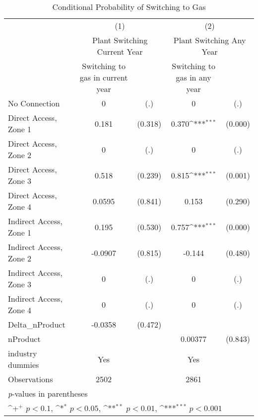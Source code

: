 \begin{table}[htbp]\centering
\def\sym#1{\ifmmode^{#1}\else\(^{#1}\)\fi}
\caption{Conditional Probability of Switching to Gas}
\begin{tabular}{l*{2}{cc}}
\toprule
                    &\multicolumn{2}{c}{(1)}           &\multicolumn{2}{c}{(2)}           \\
                    &\multicolumn{2}{c}{Plant Switching Current Year}&\multicolumn{2}{c}{Plant Switching Any Year}\\
                    &Switching to gas in current year         &            &Switching to gas in any year         &            \\
\midrule
No Connection       &           0         &         (.)&           0         &         (.)\\
Direct Access, Zone 1&       0.181         &     (0.318)&       0.370\sym{***}&     (0.000)\\
Direct Access, Zone 2&           0         &         (.)&           0         &         (.)\\
Direct Access, Zone 3&       0.518         &     (0.239)&       0.815\sym{***}&     (0.001)\\
Direct Access, Zone 4&      0.0595         &     (0.841)&       0.153         &     (0.290)\\
Indirect Access, Zone 1&       0.195         &     (0.530)&       0.757\sym{***}&     (0.000)\\
Indirect Access, Zone 2&     -0.0907         &     (0.815)&      -0.144         &     (0.480)\\
Indirect Access, Zone 3&           0         &         (.)&           0         &         (.)\\
Indirect Access, Zone 4&           0         &         (.)&           0         &         (.)\\
Delta\_nProduct      &     -0.0358         &     (0.472)&                     &            \\
nProduct            &                     &            &     0.00377         &     (0.843)\\
industry dummies    &         Yes         &            &         Yes         &            \\
\midrule
Observations        &        2502         &            &        2861         &            \\
\bottomrule
\multicolumn{5}{l}{\footnotesize \textit{p}-values in parentheses}\\
\multicolumn{5}{l}{\footnotesize \sym{+} \(p<0.1\), \sym{*} \(p<0.05\), \sym{**} \(p<0.01\), \sym{***} \(p<0.001\)}\\
\end{tabular}
\end{table}
